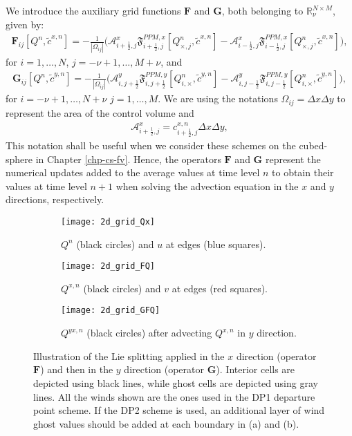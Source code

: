 We introduce the auxiliary grid functions $\mathbf{F}$ and $\mathbf{G}$, both belonging to $\mathbb{R}^{N\times M}_{\nu}$, given by:
\begin{align*}
\mathbf{F}_{ij}[{Q^n,\tilde{c}^{x,n}}] = 
-\frac{1}{|\Omega_{ij}|}
	  \big(\mathcal{A}_{i+\frac{1}{2},j}^{x} \mathfrak{F}_{i+\frac{1}{2},j}^{PPM,x}[Q^n_{\times,j},\tilde{c}^{x,n}]-
               \mathcal{A}_{i-\frac{1}{2},j}^{x} \mathfrak{F}_{i-\frac{1}{2},j}^{PPM,x}[Q^n_{\times,j},\tilde{c}^{x,n}] \big),
\end{align*}
for $i=1, \ldots, N$, $j=-\nu+1, \ldots, M + \nu$, and
\begin{align*}
\mathbf{G}_{ij}[{Q^n,\tilde{c}^{y,n}}] = 
-\frac{1}{|\Omega_{ij}|}
	  \big(\mathcal{A}_{i,j+\frac{1}{2}}^{y} \mathfrak{F}_{i,j+\frac{1}{2}}^{PPM,y}[Q^n_{i,\times},\tilde{c}^{y,n}]-
               \mathcal{A}_{i,j-\frac{1}{2}}^{y} \mathfrak{F}_{i,j-\frac{1}{2}}^{PPM,y}[Q^n_{i,\times},\tilde{c}^{y,n}] \big),
\end{align*}
for $i=-\nu+1, \ldots, N + \nu$  $j=1, \ldots, M$.
We are using the notations $\Omega_{ij}= \Delta x \Delta y$ to represent the area of the control volume and
\begin{align*}
\mathcal{A}_{i+\frac{1}{2},j}^{x} = {c}_{i+\frac{1}{2},j}^{x,n} \Delta x \Delta y,
\end{align*}
This notation shall be useful when we consider these schemes on the cubed-sphere in Chapter \ref{chp-cs-fv}.
Hence, the operators $\mathbf{F}$ and $\mathbf{G}$ represent the numerical updates added to the average values 
at time level $n$ to obtain their values at time level $n+1$ when solving the advection equation in the $x$ and $y$ directions, respectively.

\begin{figure}[!htb]
	\centering
	\begin{subfigure}{0.3\textwidth}
		\centering
		\texttt{[image: 2d\_grid\_Qx]}
		\caption{$Q^n$ (black circles) and $u$ at edges (blue squares). \label{lt-Qx}}
	\end{subfigure}
	\begin{subfigure}{0.3\textwidth}
		\centering
		\texttt{[image: 2d\_grid\_FQ]}
		\caption{$Q^{x,n}$ (black circles) and $v$ at edges (red squares).\label{lt-FQx} }
	\end{subfigure}
	\begin{subfigure}{0.3\textwidth}
	    \centering
	    \texttt{[image: 2d\_grid\_GFQ]}
		\caption{$Q^{yx,n}$ (black circles) after advecting $Q^{x,n}$ in $y$ direction. \label{lt-GFQx}}
    \end{subfigure}
	\caption{Illustration of the Lie splitting applied in the $x$ direction (operator $\mathbf{F}$)
	and then in the $y$ direction (operator $\mathbf{G}$). Interior cells are depicted using black lines,
	 while ghost cells are depicted using gray lines. 
	 All the winds shown are the ones used in the DP1 departure point scheme.
	 If the DP2 scheme is used, an additional layer of wind ghost values should be added at each boundary in (a) and (b). \label{ltxdir}}
\end{figure}



